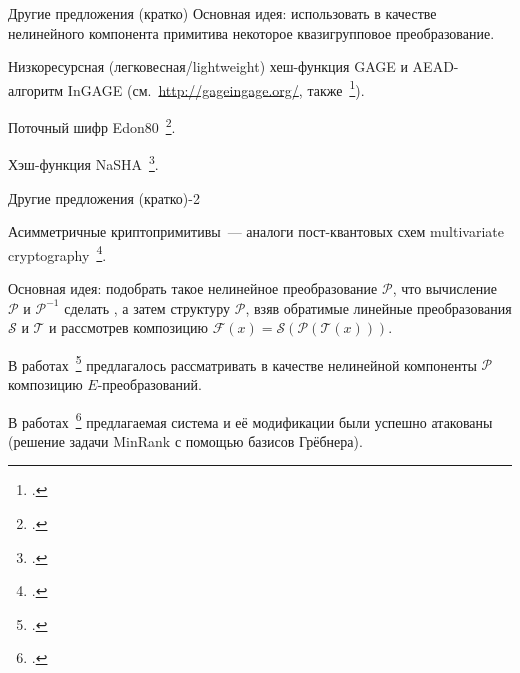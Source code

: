 \begin{frame}{Другие предложения (кратко)}
    Основная идея: использовать в качестве нелинейного компонента примитива некоторое квазигрупповое преобразование.
    \begin{coloritemize}
        \item Низкоресурсная (легковесная/lightweight) хеш-функция GAGE и AEAD-алгоритм InGAGE (см.~\url{http://gageingage.org/}, также~\footcite{otte2019gage, gligoroski2019s}).
        \item Поточный шифр Edon80~\footcite{edon80}.
        \item Хэш-функция NaSHA~\footcite{mileva2009quasigroup}.
    \end{coloritemize}
\end{frame}


\begin{frame}{Другие предложения (кратко)-2}
    \begin{coloritemize}
        \item Асимметричные криптопримитивы~--- аналоги пост-квантовых схем multivariate cryptography~\footcite{preneel}.
        \pause
        \item Основная идея: подобрать такое нелинейное преобразование $\mathcal{P}$, что вычисление $\mathcal{P}$ и $\mathcal{P}^{-1}$ сделать  , а затем   структуру $\mathcal{P}$, взяв обратимые линейные преобразования $\mathcal{S}$ и $\mathcal{T}$ и рассмотрев композицию 
        \(
            \mathcal{F}(x) = \mathcal{S} \left( \mathcal{P} \left(\mathcal{T}(x) \right) \right).
        \)
        \pause 
        \item В работах~\footcite{gligoroski2008public, gligoroski2008multivariate, chen2010multivariate, gligoroski2011mqq} предлагалось рассматривать в качестве нелинейной компоненты $\mathcal{P}$ композицию $E$-преобразований.
        \pause 
        \item В работах~\footcite{mohamed2009algebraic, faugere2015polynomial} предлагаемая система и её модификации были успешно атакованы (решение задачи MinRank с помощью базисов Грёбнера).
    \end{coloritemize}
        
\end{frame}


